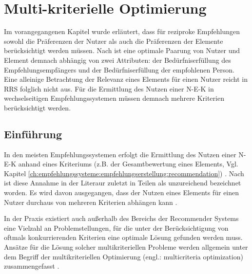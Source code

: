 
\chapter{Multi-kriterielle Optimierung}
\label{ch:erweiterungen}
Im vorangegangenen Kapitel wurde erläutert, dass für reziproke Empfehlungen sowohl die Präferenzen der Nutzer als auch die Präferenzen der Elemente berücksichtigt werden müssen.
Nach \textcite[S. 36]{li:inproceedings} ist eine optimale Paarung von Nutzer und Element demnach abhängig von zwei Attributen: der Bedürfniserfüllung des Empfehlungsempfängers und der Bedürfniserfüllung der empfohlenen Person.
Eine alleinige Betrachtung der Relevanz eines Elements für einen Nutzer reicht in \ac{RRS} folglich nicht aus.
Für die Ermittlung des Nutzen einer \ac{N-E-K} in wechselseitigen Empfehlungssystemen müssen demnach mehrere Kriterien berücksichtigt werden.

\section{Einführung}
\label{ch:erweiterungen:einführung}
In den meisten Empfehlungssystemen erfolgt die Ermittlung des Nutzen einer \ac{N-E-K} anhand eines Kriteriums (z.B. der Gesamtbewertung eines Elements, Vgl. Kapitel \ref{ch:empfehlungssysteme:empfehlungserstellung:recommendation}) \cite[S. 847]{adomavicius:4:inbook}\cite[S. 745]{adomavicius:inproceedings}\cite[S. 49]{adomavicius:inproceedings:2}\cite[S. 424]{manouselis:article}\cite[S. 65]{lakiotaki:article}.
Nach \textcite[S. 847f.]{adomavicius:4:inbook} ist diese Annahme in der Literaur zuletzt in Teilen als unzureichend bezeichnet worden.
Es wird davon ausgegangen, dass der Nutzen eines Elements für einen Nutzer durchaus von mehreren Kriterien abhängen kann \cite[S. 847f.]{adomavicius:4:inbook}.

In der Praxis existiert auch außerhalb des Bereichs der Recommender Systems eine Vielzahl an Problemstellungen, für die unter der Berücksichtigung von oftmals konkurrierenden Kriterien eine optimale Lösung gefunden werden muss.
Ansätze für die Lösung solcher multikriteriellen Probleme werden allgemein unter dem Begriff der multikriteriellen Optimierung (engl.: multicriteria optimization) zusammengefasst \cite[S. v]{ehrgott:book}\cite[S. 867]{adomavicius:4:inbook}.

